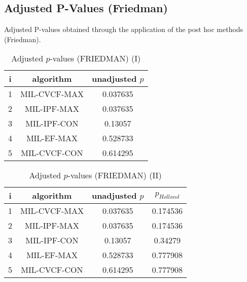 \documentclass[a4paper,10pt]{article}
\begin{document}
\begin{landscape}
\newpage

\section{Adjusted P-Values (Friedman)}


Adjusted P-values obtained through the application of the post hoc methods (Friedman).

\begin{table}[!htp]
\centering\small
\begin{tabular}{ccc}
i&algorithm&unadjusted $p$\\
\hline1&MIL-CVCF-MAX&0.037635\\2&MIL-IPF-MAX&0.037635\\3&MIL-IPF-CON&0.13057\\4&MIL-EF-MAX&0.528733\\5&MIL-CVCF-CON&0.614295\\\hline
\end{tabular}
\caption{Adjusted $p$-values (FRIEDMAN) (I)}
\end{table}
\begin{table}[!htp]
\centering\small
\begin{tabular}{cccc}
i&algorithm&unadjusted $p$&$p_{Holland}$\\
\hline1&MIL-CVCF-MAX&0.037635&0.174536\\2&MIL-IPF-MAX&0.037635&0.174536\\3&MIL-IPF-CON&0.13057&0.34279\\4&MIL-EF-MAX&0.528733&0.777908\\5&MIL-CVCF-CON&0.614295&0.777908\\\hline
\end{tabular}
\caption{Adjusted $p$-values (FRIEDMAN) (II)}
\end{table}

\newpage
\end{landscape}
\end{document}
